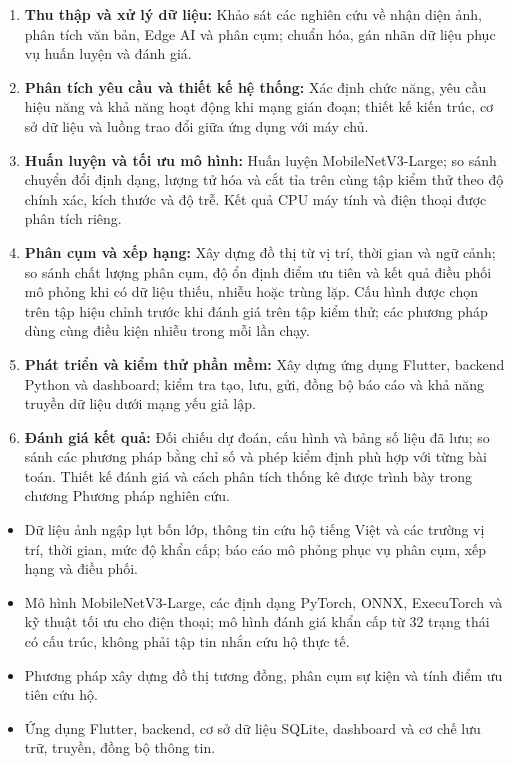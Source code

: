 \begin{enumerate}
    \item \textbf{Thu thập và xử lý dữ liệu:} Khảo sát các nghiên cứu về nhận diện ảnh, phân tích văn bản, Edge AI và phân cụm; chuẩn hóa, gán nhãn dữ liệu phục vụ huấn luyện và đánh giá.
    \item \textbf{Phân tích yêu cầu và thiết kế hệ thống:} Xác định chức năng, yêu cầu hiệu năng và khả năng hoạt động khi mạng gián đoạn; thiết kế kiến trúc, cơ sở dữ liệu và luồng trao đổi giữa ứng dụng với máy chủ.
    \item \textbf{Huấn luyện và tối ưu mô hình:} Huấn luyện MobileNetV3-Large; so sánh chuyển đổi định dạng, lượng tử hóa và cắt tỉa trên cùng tập kiểm thử theo độ chính xác, kích thước và độ trễ. Kết quả CPU máy tính và điện thoại được phân tích riêng.
    \item \textbf{Phân cụm và xếp hạng:} Xây dựng đồ thị từ vị trí, thời gian và ngữ cảnh; so sánh chất lượng phân cụm, độ ổn định điểm ưu tiên và kết quả điều phối mô phỏng khi có dữ liệu thiếu, nhiễu hoặc trùng lặp. Cấu hình được chọn trên tập hiệu chỉnh trước khi đánh giá trên tập kiểm thử; các phương pháp dùng cùng điều kiện nhiễu trong mỗi lần chạy.
    \item \textbf{Phát triển và kiểm thử phần mềm:} Xây dựng ứng dụng Flutter, backend Python và dashboard; kiểm tra tạo, lưu, gửi, đồng bộ báo cáo và khả năng truyền dữ liệu dưới mạng yếu giả lập.
    \item \textbf{Đánh giá kết quả:} Đối chiếu dự đoán, cấu hình và bảng số liệu đã lưu; so sánh các phương pháp bằng chỉ số và phép kiểm định phù hợp với từng bài toán. Thiết kế đánh giá và cách phân tích thống kê được trình bày trong chương Phương pháp nghiên cứu.
\end{enumerate}


\begin{itemize}
    \item Dữ liệu ảnh ngập lụt bốn lớp, thông tin cứu hộ tiếng Việt và các trường vị trí, thời gian, mức độ khẩn cấp; báo cáo mô phỏng phục vụ phân cụm, xếp hạng và điều phối.
    \item Mô hình MobileNetV3-Large, các định dạng PyTorch, ONNX, ExecuTorch và kỹ thuật tối ưu cho điện thoại; mô hình đánh giá khẩn cấp từ 32 trạng thái có cấu trúc, không phải tập tin nhắn cứu hộ thực tế.
    \item Phương pháp xây dựng đồ thị tương đồng, phân cụm sự kiện và tính điểm ưu tiên cứu hộ.
    \item Ứng dụng Flutter, backend, cơ sở dữ liệu SQLite, dashboard và cơ chế lưu trữ, truyền, đồng bộ thông tin.
\end{itemize}


